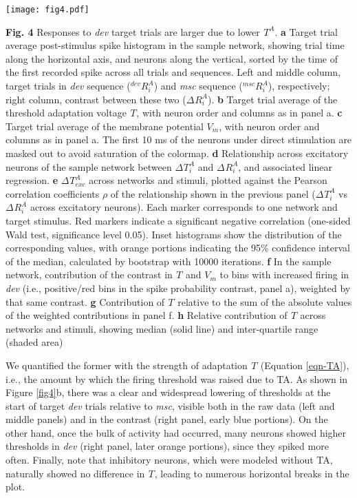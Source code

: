 \documentclass[pdflatex,referee,iicol,sn-basic]{sn-jnl}
\newcommand{\dev}{\textit{dev}}
\newcommand{\msc}{\textit{msc}}
\renewcommand{\R}[3][]{{}^{#1}_{}\!R^{#2}_{#3}}
\renewcommand{\T}[3][]{{}^{#1}_{}T^{#2}_{#3}}
\theoremstyle{thmstyleone}%
\theoremstyle{thmstyletwo}%
\theoremstyle{thmstylethree}%
\begin{document}
\begin{figure*}%
    \centering
    \texttt{[image: fig4.pdf]}
    \caption{}
    \label{fig4}
\end{figure*}
\textbf{Fig. 4} Responses to \dev{} target trials are larger due to lower $\T{A}{}$.
\textbf{a} Target trial average post-stimulus spike histogram in the sample network, showing trial time along the horizontal axis, and neurons along the vertical, sorted by the time of the first recorded spike across all trials and sequences. Left and middle column, target trials in \dev{} sequence ($\R[dev]{A}{i}$) and \msc{} sequence ($\R[msc]{A}{i}$), respectively; right column, contrast between these two ($\Delta \R{A}{i}$).
\textbf{b} Target trial average of the threshold adaptation voltage $\T{}{}$, with neuron order and columns as in panel a.
\textbf{c} Target trial average of the membrane potential $V_m$, with neuron order and columns as in panel a. The first 10 ms of the neurons under direct stimulation are masked out to avoid saturation of the colormap.
\textbf{d} Relationship across excitatory neurons of the sample network between $\Delta \T{A}{i}$ and $\Delta \R{A}{i}$, and associated linear regression.
\textbf{e} $\Delta \T{A}{exc}$ across networks and stimuli, plotted against the Pearson correlation coefficients $\rho$ of the relationship shown in the previous panel ($\Delta \T{A}{i}$ vs $\Delta \R{A}{i}$ across excitatory neurons). Each marker corresponds to one network and target stimulus. Red markers indicate a significant negative correlation (one-sided Wald test, significance level 0.05). Inset histograms show the distribution of the corresponding values, with orange portions indicating the 95\% confidence interval of the median, calculated by bootstrap with 10000 iterations.
\textbf{f} In the sample network, contribution of the contrast in $\T{}{}$ and $V_m$ to bins with increased firing in \dev{} (i.e., positive/red bins in the spike probability contrast, panel a), weighted by that same contrast.
\textbf{g} Contribution of $\T{}{}$ relative to the sum of the absolute values of the weighted contributions in panel f.
\textbf{h} Relative contribution of $\T{}{}$ across networks and stimuli, showing median (solid line) and inter-quartile range (shaded area)

We quantified the former with the strength of adaptation $\T{}{}$ (Equation \ref{eqn-TA}), i.e., the amount by which the firing threshold was raised due to TA. As shown in Figure \ref{fig4}b, there was a clear and widespread lowering of thresholds at the start of target \dev{} trials relative to \msc{}, visible both in the raw data (left and middle panels) and in the contrast (right panel, early blue portions). On the other hand, once the bulk of activity had occurred, many neurons showed higher thresholds in \dev{} (right panel, later orange portions), since they spiked more often. Finally, note that inhibitory neurons, which were modeled without TA, naturally showed no difference in $\T{}{}$, leading to numerous horizontal breaks in the plot.
\end{document}
